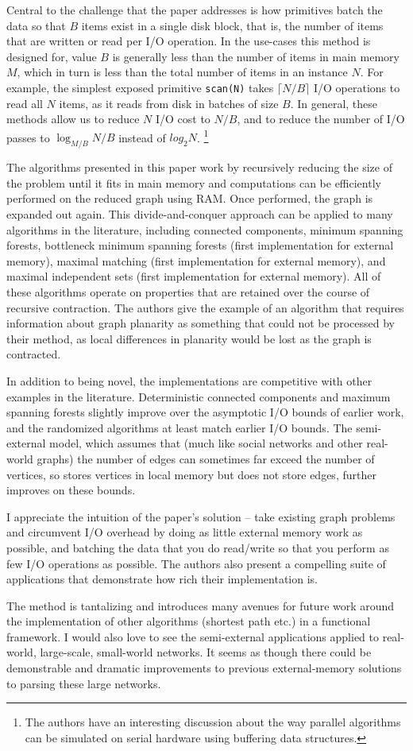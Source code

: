 Central to the challenge that the paper addresses is how primitives batch the data so that $B$ items exist in a single disk block, that is, the number of items that are written or read per I/O operation. In the use-cases this method is designed for, value $B$ is generally less than the number of items in main memory $M$, which in turn is less than the total number of items in an instance $N$. For example, the simplest exposed primitive \texttt{scan(N)} takes $\lceil N/B \rceil$ I/O operations to read all $N$ items, as it reads from disk in batches of size $B$. In general, these methods allow us to reduce $N$ I/O cost to $N/B$, and to reduce the number of I/O passes to $\log_{M/B}{N/B}$ instead of $log_2{N}$. \footnote{The authors have an interesting discussion about the way parallel algorithms can be simulated on serial hardware using buffering data structures.}

The algorithms presented in this paper work by recursively reducing the size of the problem until it fits in main memory and computations can be efficiently performed on the reduced graph using RAM. Once performed, the graph is expanded out again. This divide-and-conquer approach can be applied to many algorithms in the literature, including connected components, minimum spanning forests, bottleneck minimum spanning forests (first implementation for external memory), maximal matching (first implementation for external memory), and maximal independent sets (first implementation for external memory). All of these algorithms operate on properties that are retained over the course of recursive contraction. The authors give the example of an algorithm that requires information about graph planarity as something that could not be processed by their method, as local differences in planarity would be lost as the graph is contracted. 

In addition to being novel, the implementations are competitive with other examples in the literature. Deterministic connected components and maximum spanning forests slightly improve over the asymptotic I/O bounds of earlier work, and the randomized algorithms at least match earlier I/O bounds. The semi-external model, which assumes that (much like social networks and other real-world graphs) the number of edges can sometimes far exceed the number of vertices, so stores vertices in local memory but does not store edges, further improves on these bounds.

I appreciate the intuition of the paper's solution -- take existing graph problems and circumvent I/O overhead by doing as little external memory work as possible, and batching the data that you do read/write so that you perform as few I/O operations as possible. The authors also present a compelling suite of applications that demonstrate how rich their implementation is. 

The method is tantalizing and introduces many avenues for future work around the implementation of other algorithms (shortest path etc.) in a functional framework. I would also love to see the semi-external applications applied to real-world, large-scale, small-world networks. It seems as though there could be demonstrable and dramatic improvements to previous external-memory solutions to parsing these large networks. 
